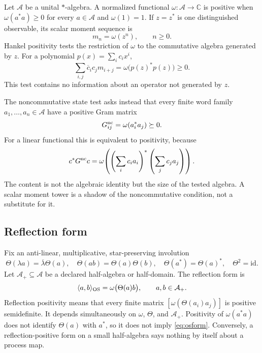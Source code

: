 \documentclass[11pt,a4paper]{article}
\theoremstyle{definition}
\theoremstyle{remark}
\newcommand{\C}{\mathbb C}
\newcommand{\A}{\mathcal A}
\newcommand{\id}{\mathrm{id}}
\begin{document}
Let $\A$ be a unital $*$-algebra.  A normalized functional $\omega:\A\to\C$ is
positive when $\omega(a^*a)\geq0$ for every $a\in\A$ and $\omega(1)=1$.  If $z=z^*$
is one distinguished observable, its scalar moment sequence is
\begin{equation}
  m_n=\omega(z^n),\qquad n\geq0.
\end{equation}
Hankel positivity tests the restriction of $\omega$ to the commutative algebra
generated by $z$.  For a polynomial $p(x)=\sum_i c_i x^i$,
\begin{equation}
  \sum_{i,j}\overline c_i c_j m_{i+j}
  =\omega\bigl(p(z)^*p(z)\bigr)\geq0.
  \label{eq:hankel}
\end{equation}
This test contains no information about an operator not generated by $z$.

The noncommutative state test asks instead that every finite word family
$a_1,\ldots,a_n\in\A$ have a positive Gram matrix
\begin{equation}
  G^{\rm nc}_{ij}=\omega(a_i^*a_j)\succeq0.
  \label{eq:ncgram}
\end{equation}
For a linear functional this is equivalent to positivity, because
\begin{equation*}
c^*G^{\rm nc}c=\omega\!\left(
  \left(\sum_i c_i a_i\right)^*\left(\sum_jc_j a_j\right)\right).
\end{equation*}
The content is not the
algebraic identity but the size of the tested algebra.  A scalar moment tower is a
shadow of the noncommutative condition, not a substitute for it.

\subsection{Reflection form}

Fix an anti-linear, multiplicative, star-preserving involution
\begin{equation}
  \Theta(\lambda a)=\overline\lambda\Theta(a),\quad
  \Theta(ab)=\Theta(a)\Theta(b),\quad
  \Theta(a^*)=\Theta(a)^*,\quad \Theta^2=\id.
  \label{eq:theta-type}
\end{equation}
Let $\A_+\subseteq\A$ be a declared half-algebra or half-domain.  The reflection form
is
\begin{equation}
  \langle a,b\rangle_{\rm OS}=\omega\bigl(\Theta(a)b\bigr),
  \qquad a,b\in\A_+.
  \label{eq:osform}
\end{equation}
Reflection positivity means that every finite matrix
$[\omega(\Theta(a_i)a_j)]$ is positive semidefinite.  It depends simultaneously on
$\omega$, $\Theta$, and $\A_+$.  Positivity of $\omega(a^*a)$ does not identify
$\Theta(a)$ with $a^*$, so it does not imply \eqref{eq:osform}.  Conversely, a
reflection-positive form on a small half-algebra says nothing by itself about a process
map.
\end{document}
